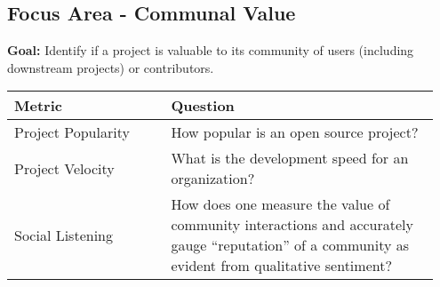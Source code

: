 
\subsection{Focus Area - Communal Value}
\textbf{Goal:} Identify if a project is valuable to its community of users (including downstream projects) or contributors.
\begin{table}[ht!]
    \centering
    \begin{tabular}{|p{0.35\linewidth} | p{0.6\linewidth}|}
        \hline
        \hfil \textbf{Metric}  & \hfil \textbf{Question} \\
        \hline
    		Project Popularity & How popular is an open source project? \\ 
		\hline
		Project Velocity & What is the development speed for an organization? \\ 
		\hline
		Social Listening & How does one measure the value of community interactions and accurately gauge “reputation” of a community as evident from qualitative sentiment? \\ 
		\hline
    \end{tabular}
\end{table}
    
 
 
 
